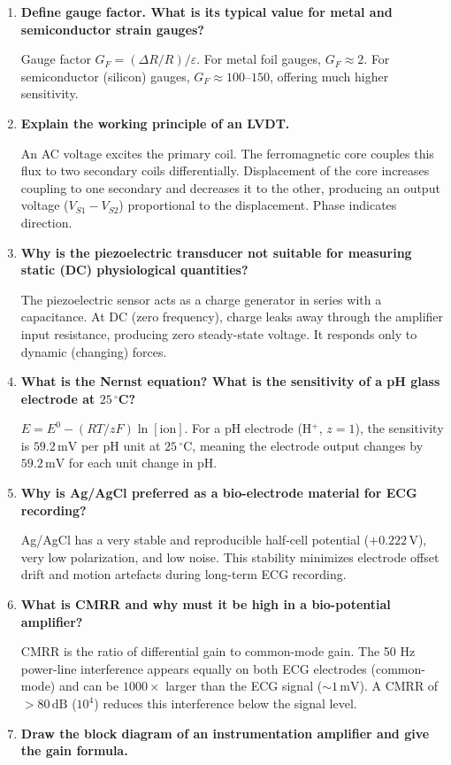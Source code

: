 \documentclass[12pt,a4paper]{article}
\newcommand{\Q}[1]{\textbf{#1}\par\noindent\ignorespaces}
\begin{document}
\begin{tcolorbox}[exambox, title={\textbf{Frequently Asked / Viva Questions}}]
\begin{enumerate}[topsep=0pt, label=\textbf{Q\arabic*.}, itemsep=5pt]
  \item \Q{Define gauge factor. What is its typical value for metal and semiconductor strain gauges?}
    Gauge factor $G_F = (\Delta R / R) / \varepsilon$. For metal foil gauges, $G_F \approx 2$. For semiconductor (silicon) gauges, $G_F \approx 100$--$150$, offering much higher sensitivity.
  \item \Q{Explain the working principle of an LVDT.}
    An AC voltage excites the primary coil. The ferromagnetic core couples this flux to two secondary coils differentially. Displacement of the core increases coupling to one secondary and decreases it to the other, producing an output voltage ($V_{S1} - V_{S2}$) proportional to the displacement. Phase indicates direction.
  \item \Q{Why is the piezoelectric transducer not suitable for measuring static (DC) physiological quantities?}
    The piezoelectric sensor acts as a charge generator in series with a capacitance. At DC (zero frequency), charge leaks away through the amplifier input resistance, producing zero steady-state voltage. It responds only to dynamic (changing) forces.
  \item \Q{What is the Nernst equation? What is the sensitivity of a pH glass electrode at $25\,^{\circ}$C?}
    $E = E^0 - (RT/zF)\ln[\text{ion}]$. For a pH electrode (H$^+$, $z=1$), the sensitivity is $59.2\,\text{mV}$ per pH unit at $25\,^{\circ}$C, meaning the electrode output changes by $59.2\,\text{mV}$ for each unit change in pH.
  \item \Q{Why is Ag/AgCl preferred as a bio-electrode material for ECG recording?}
    Ag/AgCl has a very stable and reproducible half-cell potential ($+0.222\,\text{V}$), very low polarization, and low noise. This stability minimizes electrode offset drift and motion artefacts during long-term ECG recording.
  \item \Q{What is CMRR and why must it be high in a bio-potential amplifier?}
    CMRR is the ratio of differential gain to common-mode gain. The 50 Hz power-line interference appears equally on both ECG electrodes (common-mode) and can be $1000\times$ larger than the ECG signal ($\sim 1\,\text{mV}$). A CMRR of $> 80\,\text{dB}$ ($10^4$) reduces this interference below the signal level.
  \item \Q{Draw the block diagram of an instrumentation amplifier and give the gain formula.}

\end{enumerate}
\end{tcolorbox}
\end{document}
